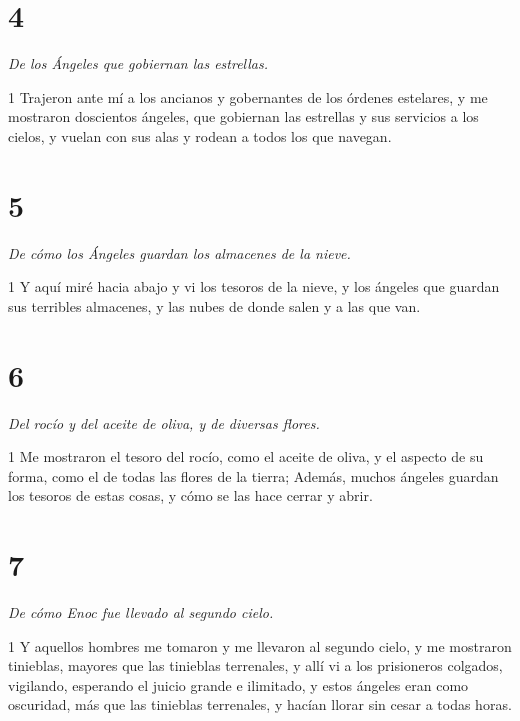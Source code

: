 \chapter{4}

\par \textit{De los Ángeles que gobiernan las estrellas.}

\par 1 Trajeron ante mí a los ancianos y gobernantes de los órdenes estelares, y me mostraron doscientos ángeles, que gobiernan las estrellas y sus servicios a los cielos, y vuelan con sus alas y rodean a todos los que navegan.

\chapter{5}

\par \textit{De cómo los Ángeles guardan los almacenes de la nieve.}

\par 1 Y aquí miré hacia abajo y vi los tesoros de la nieve, y los ángeles que guardan sus terribles almacenes, y las nubes de donde salen y a las que van.

\chapter{6}

\par \textit{Del rocío y del aceite de oliva, y de diversas flores.}

\par 1 Me mostraron el tesoro del rocío, como el aceite de oliva, y el aspecto de su forma, como el de todas las flores de la tierra; Además, muchos ángeles guardan los tesoros de estas cosas, y cómo se las hace cerrar y abrir.

\chapter{7}

\par \textit{De cómo Enoc fue llevado al segundo cielo.}

\par 1 Y aquellos hombres me tomaron y me llevaron al segundo cielo, y me mostraron tinieblas, mayores que las tinieblas terrenales, y allí vi a los prisioneros colgados, vigilando, esperando el juicio grande e ilimitado, y estos ángeles eran como oscuridad, más que las tinieblas terrenales, y hacían llorar sin cesar a todas horas.

